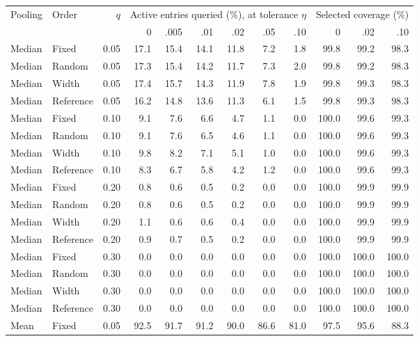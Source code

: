 \begin{table}[t]
\centering\small\setlength{\tabcolsep}{3pt}
\begin{tabular}{llrrrrrrrrrr}
\toprule
Pooling & Order & $q$ & \multicolumn{6}{c}{Active entries queried (\%), at tolerance $\eta$} & \multicolumn{3}{c}{Selected coverage (\%)} \\
\cmidrule(lr){4-9}\cmidrule(lr){10-12}
 & & & 0 & .005 & .01 & .02 & .05 & .10 & 0 & .02 & .10 \\
\midrule
Median & Fixed & 0.05 & 17.1 & 15.4 & 14.1 & 11.8 & 7.2 & 1.8 & 99.8 & 99.2 & 98.3 \\
Median & Random & 0.05 & 17.3 & 15.4 & 14.2 & 11.7 & 7.3 & 2.0 & 99.8 & 99.2 & 98.3 \\
Median & Width & 0.05 & 17.4 & 15.7 & 14.3 & 11.9 & 7.8 & 1.9 & 99.8 & 99.3 & 98.3 \\
Median & Reference & 0.05 & 16.2 & 14.8 & 13.6 & 11.3 & 6.1 & 1.5 & 99.8 & 99.3 & 98.3 \\
\addlinespace
Median & Fixed & 0.10 & 9.1 & 7.6 & 6.6 & 4.7 & 1.1 & 0.0 & 100.0 & 99.6 & 99.3 \\
Median & Random & 0.10 & 9.1 & 7.6 & 6.5 & 4.6 & 1.1 & 0.0 & 100.0 & 99.6 & 99.3 \\
Median & Width & 0.10 & 9.8 & 8.2 & 7.1 & 5.1 & 1.0 & 0.0 & 100.0 & 99.6 & 99.3 \\
Median & Reference & 0.10 & 8.3 & 6.7 & 5.8 & 4.2 & 1.2 & 0.0 & 100.0 & 99.6 & 99.3 \\
\addlinespace
Median & Fixed & 0.20 & 0.8 & 0.6 & 0.5 & 0.2 & 0.0 & 0.0 & 100.0 & 99.9 & 99.9 \\
Median & Random & 0.20 & 0.8 & 0.6 & 0.5 & 0.2 & 0.0 & 0.0 & 100.0 & 99.9 & 99.9 \\
Median & Width & 0.20 & 1.1 & 0.6 & 0.6 & 0.4 & 0.0 & 0.0 & 100.0 & 99.9 & 99.9 \\
Median & Reference & 0.20 & 0.9 & 0.7 & 0.5 & 0.2 & 0.0 & 0.0 & 100.0 & 99.9 & 99.9 \\
\addlinespace
Median & Fixed & 0.30 & 0.0 & 0.0 & 0.0 & 0.0 & 0.0 & 0.0 & 100.0 & 100.0 & 100.0 \\
Median & Random & 0.30 & 0.0 & 0.0 & 0.0 & 0.0 & 0.0 & 0.0 & 100.0 & 100.0 & 100.0 \\
Median & Width & 0.30 & 0.0 & 0.0 & 0.0 & 0.0 & 0.0 & 0.0 & 100.0 & 100.0 & 100.0 \\
Median & Reference & 0.30 & 0.0 & 0.0 & 0.0 & 0.0 & 0.0 & 0.0 & 100.0 & 100.0 & 100.0 \\
\addlinespace
\midrule
Mean & Fixed & 0.05 & 92.5 & 91.7 & 91.2 & 90.0 & 86.6 & 81.0 & 97.5 & 95.6 & 88.3 \\

\end{tabular}
\end{table}
